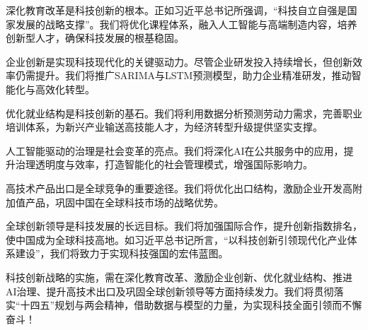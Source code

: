 深化教育改革是科技创新的根本。正如习近平总书记所强调，“科技自立自强是国家发展的战略支撑”。我们将优化课程体系，融入人工智能与高端制造内容，培养创新型人才，确保科技发展的根基稳固。

企业创新是实现科技现代化的关键驱动力。尽管企业研发投入持续增长，但创新效率仍需提升。我们将推广SARIMA与LSTM预测模型，助力企业精准研发，推动智能化与高效化转型。

优化就业结构是科技创新的基石。我们将利用数据分析预测劳动力需求，完善职业培训体系，为新兴产业输送高技能人才，为经济转型升级提供坚实支撑。

人工智能驱动的治理是社会变革的亮点。我们将深化AI在公共服务中的应用，提升治理透明度与效率，打造智能化的社会管理模式，增强国际影响力。

高技术产品出口是全球竞争的重要途径。我们将优化出口结构，激励企业开发高附加值产品，巩固中国在全球科技市场的战略优势。

全球创新领导是科技发展的长远目标。我们将加强国际合作，提升创新指数排名，使中国成为全球科技高地。如习近平总书记所言，“以科技创新引领现代化产业体系建设”，我们将致力于实现科技强国的宏伟蓝图。

科技创新战略的实施，需在深化教育改革、激励企业创新、优化就业结构、推进AI治理、提升高技术出口及巩固全球创新领导等方面持续发力。我们将贯彻落实“十四五”规划与两会精神，借助数据与模型的力量，为实现科技全面引领而不懈奋斗！

